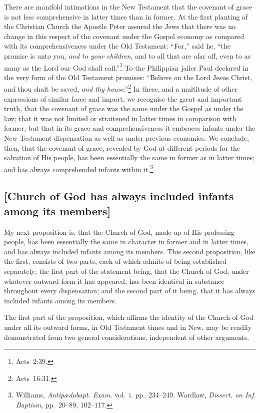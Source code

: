 \documentclass[
  english,
]{book}
\begin{document}
There are manifold intimations in the New Testament that the covenant of grace is not less comprehensive in latter times than in former. At the first planting of the Christian Church the Apostle Peter assured the Jews that there was no change in this respect of the covenant under the Gospel economy as compared with its comprehensiveness under the Old Testament: ``For,'' said he, ``the promise is unto you, \emph{and to your children}, and to all that are afar off, even to as many as the Lord our God shall call.''\footnote{Acts~2:39.} To the Philippian jailer Paul declared in the very form of the Old Testament promises: ``Believe on the Lord Jesus Christ, and thou shalt be saved, \emph{and thy house}.''\footnote{Acts~16:31.} In these, and a multitude of other expressions of similar force and import, we recognise the great and important truth, that the covenant of grace was the same under the Gospel as under the law; that it was not limited or straitened in latter times in comparison with former; but that in its grace and comprehensiveness it embraces infants under the New Testament dispensation as well as under previous economies. We conclude, then, that the covenant of grace, revealed by God at different periods for the salvation of His people, has been essentially the same in former as in latter times; and has always comprehended infants within it.\footnote{Williams, \emph{Antipædobapt. Exam.} vol.~i. pp.~234--249. Wardlaw, \emph{Dissert. on Inf. Baptism}, pp.~20--89, 102--117.}

\hypertarget{church-of-god-has-always-included-infants-among-its-members}{%
\subsection{{[}Church of God has always included infants among its members{]}}\label{church-of-god-has-always-included-infants-among-its-members}}

My next proposition is, that the Church of God, made up of His professing people, has been essentially the same in character in former and in latter times, and has always included infants among its members. This second proposition, like the first, consists of two parts, each of which admits of being established separately; the first part of the statement being, that the Church of God, under whatever outward form it has appeared, has been identical in substance throughout every dispensation; and the second part of it being, that it has always included infants among its members.

The first part of the proposition, which affirms the identity of the Church of God under all its outward forms, in Old Testament times and in New, may be readily demonstrated from two general considerations, independent of other arguments.
\end{document}
